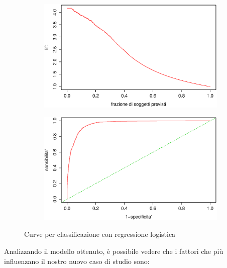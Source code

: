\begin{figure}[H]
  \begin{subfigure}{0.4\textwidth}
    \includegraphics[width=\columnwidth]{images/class/lift-log-reg.eps}
  \end{subfigure}
  \hspace*{\fill}
  \begin{subfigure}{0.4\textwidth}
    \includegraphics[width=\columnwidth]{images/class/roc-log-reg.eps}
  \end{subfigure}
  \caption{Curve per classificazione con regressione logistica}
  \label{fig:class-reg-1og}
\end{figure}

Analizzando il modello ottenuto, è possibile vedere che i fattori che più
influenzano il nostro nuovo caso di studio sono:

